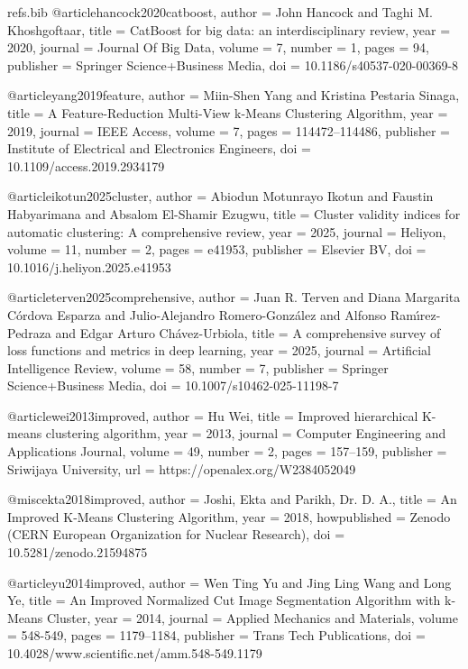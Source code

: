 \begin{filecontents*}[overwrite]{refs.bib}
@article{hancock2020catboost,
  author = {John Hancock and Taghi M. Khoshgoftaar},
  title = {{CatBoost for big data: an interdisciplinary review}},
  year = {2020},
  journal = {Journal Of Big Data},
  volume = {7},
  number = {1},
  pages = {94},
  publisher = {Springer Science+Business Media},
  doi = {10.1186/s40537-020-00369-8}
}

@article{yang2019feature,
  author = {Miin{-}Shen Yang and Kristina Pestaria Sinaga},
  title = {{A Feature-Reduction Multi-View k-Means Clustering Algorithm}},
  year = {2019},
  journal = {IEEE Access},
  volume = {7},
  pages = {114472--114486},
  publisher = {Institute of Electrical and Electronics Engineers},
  doi = {10.1109/access.2019.2934179}
}

@article{ikotun2025cluster,
  author = {Abiodun Motunrayo Ikotun and Faustin Habyarimana and Absalom El-Shamir Ezugwu},
  title = {{Cluster validity indices for automatic clustering: A comprehensive review}},
  year = {2025},
  journal = {Heliyon},
  volume = {11},
  number = {2},
  pages = {e41953},
  publisher = {Elsevier BV},
  doi = {10.1016/j.heliyon.2025.e41953}
}

@article{terven2025comprehensive,
  author = {Juan R. Terven and Diana Margarita C{\'o}rdova Esparza and Julio-Alejandro Romero-Gonz{\'a}lez and Alfonso Ram{\'\i}rez-Pedraza and Edgar Arturo Ch{\'a}vez{-}Urbiola},
  title = {{A comprehensive survey of loss functions and metrics in deep learning}},
  year = {2025},
  journal = {Artificial Intelligence Review},
  volume = {58},
  number = {7},
  publisher = {Springer Science+Business Media},
  doi = {10.1007/s10462-025-11198-7}
}

@article{wei2013improved,
  author = {Hu Wei},
  title = {{Improved hierarchical K-means clustering algorithm}},
  year = {2013},
  journal = {Computer Engineering and Applications Journal},
  volume = {49},
  number = {2},
  pages = {157--159},
  publisher = {Sriwijaya University},
  url = {https://openalex.org/W2384052049}
}

@misc{ekta2018improved,
  author = {Joshi, Ekta and Parikh, Dr. D. A.},
  title = {{An Improved K-Means Clustering Algorithm}},
  year = {2018},
  howpublished = {Zenodo (CERN European Organization for Nuclear Research)},
  doi = {10.5281/zenodo.21594875}
}

@article{yu2014improved,
  author = {Wen Ting Yu and Jing Ling Wang and Long Ye},
  title = {{An Improved Normalized Cut Image Segmentation Algorithm with k-Means Cluster}},
  year = {2014},
  journal = {Applied Mechanics and Materials},
  volume = {548-549},
  pages = {1179--1184},
  publisher = {Trans Tech Publications},
  doi = {10.4028/www.scientific.net/amm.548-549.1179}
}


\end{filecontents*}
